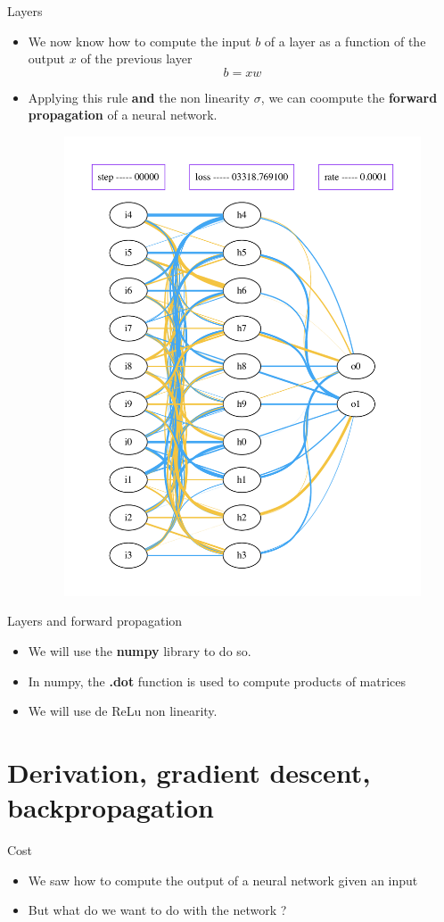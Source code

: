\documentclass{beamer}
\begin{document}
\begin{frame}{Layers}
    \begin{itemize}
        \item We now know how to compute the input $b$ of a layer as a function of
            the output $x$ of the previous layer  
            \begin{equation}
                b=xw
            \end{equation}
        \item Applying this rule \textbf{{and}} the non linearity $\sigma$, we
            can coompute the \textbf{{forward propagation}} of a neural
            network.
        \begin{figure}[htpb]
            \centering
            \includegraphics[width=0.3\linewidth]{net_0}
            \label{fig:net_}
        \end{figure}
    \end{itemize}
\end{frame}


\begin{frame}{Layers and forward propagation}
   \begin{itemize}
       \item We will use the \textbf{{numpy}} library to do so.
           \item In numpy, the \textbf{{.dot}} function is used to compute
               products of matrices
            \item We will use de ReLu non linearity.
   \end{itemize} 
\end{frame}

\section{Derivation, gradient descent, backpropagation}%
\label{sec:derivation_gradient_descent_backpropagation}

\begin{frame}{Cost}
    \begin{itemize}
        \item We saw how to compute the output of a neural network given an
            input
        \item But what do we want to do with the network ?
    \end{itemize}
\end{frame}
\end{document}
